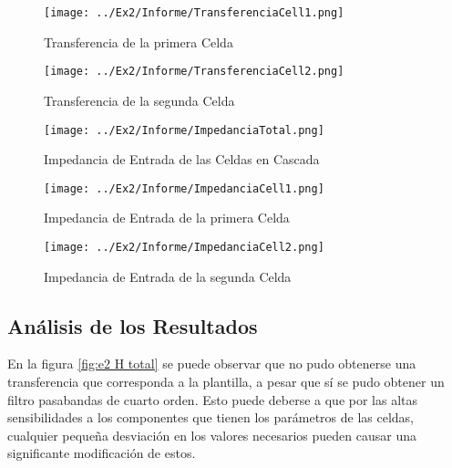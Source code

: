 \begin{figure}[ht]
\begin{center}
\texttt{[image: ../Ex2/Informe/TransferenciaCell1.png]}
\caption{Transferencia de la primera Celda}
\label{fig:e2 H cell1}
\end{center}
\end{figure}

\begin{figure}[ht]
\begin{center}
\texttt{[image: ../Ex2/Informe/TransferenciaCell2.png]}
\caption{Transferencia de la segunda Celda}
\label{fig:e2 H cell2}
\end{center}
\end{figure}

\begin{figure}[ht]
\begin{center}
\texttt{[image: ../Ex2/Informe/ImpedanciaTotal.png]}
\caption{Impedancia de Entrada de las Celdas en Cascada}
\label{fig:e2 Z total}
\end{center}
\end{figure}

\begin{figure}[ht]
\begin{center}
\texttt{[image: ../Ex2/Informe/ImpedanciaCell1.png]}
\caption{Impedancia de Entrada de la primera Celda}
\label{fig:e2 Z cell1}
\end{center}
\end{figure}

\begin{figure}[ht]
\begin{center}
\texttt{[image: ../Ex2/Informe/ImpedanciaCell2.png]}
\caption{Impedancia de Entrada de la segunda Celda}
\label{fig:e2 Z cell2}
\end{center}
\end{figure}

\subsection{Análisis de los Resultados}

En la figura \ref{fig:e2 H total} se puede observar que no pudo obtenerse una transferencia que corresponda a la plantilla, a pesar que sí se pudo obtener un filtro pasabandas de cuarto orden. Esto puede deberse a que por las altas sensibilidades a los componentes que tienen los parámetros de las celdas, cualquier pequeña desviación en los valores necesarios pueden causar una significante modificación de estos.

